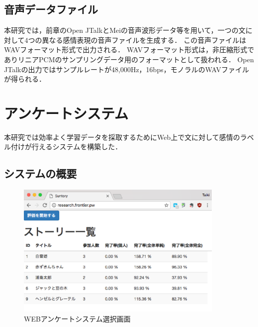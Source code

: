 \subsection{音声データファイル}
本研究では，前章のOpen JTalkとMeiの音声波形データ等を用いて，一つの文に対して4つの異なる感情表現の音声ファイルを生成する．
この音声ファイルはWAVフォーマット形式で出力される．
WAVフォーマット形式は，非圧縮形式でありリニアPCMのサンプリングデータ用のフォーマットとして扱われる．
Open JTalkの出力ではサンプルレートが48,000Hz，16bps，モノラルのWAVファイルが得られる．

\section{アンケートシステム}

本研究では効率よく学習データを採取するためにWeb上で文に対して感情のラベル付けが行えるシステムを構築した．

\subsection{システムの概要}
\begin{figure}[ht]
  \begin{center}
    \includegraphics[clip,width=10cm]{fig/web-index.eps}
    \caption{WEBアンケートシステム選択画面}
    \label{fig:index-web}
  \end{center}
\end{figure}

